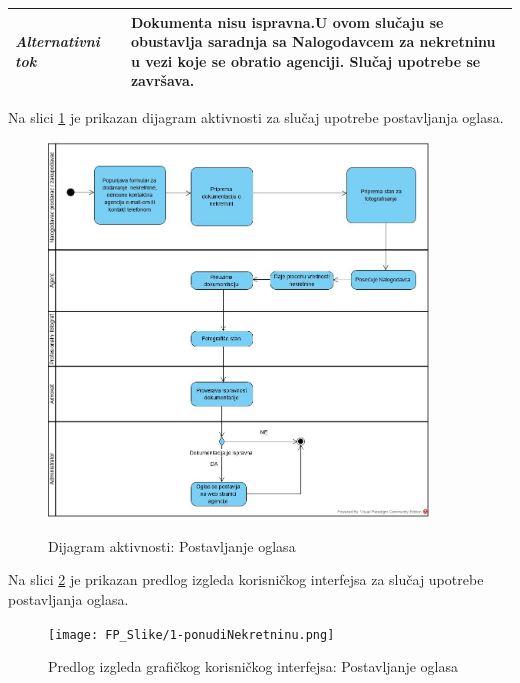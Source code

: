 \documentclass[20pt]{article}
\begin{document}
\begin{center}
\begin{longtable}{p{0.23\linewidth} p{0.77\linewidth}}
 {\it \bfseries Alternativni tok} & Dokumenta nisu ispravna.U ovom slu\v{c}aju se obustavlja saradnja sa Nalogodavcem za nekretninu u vezi koje se obratio agenciji. Slu\v{c}aj upotrebe se zavr\v{s}ava.\\
 \hline

\end{longtable}
\end{center}

\newpage
{}
\setlength{\parindent}{1cm}
\fontsize{13}{18} \selectfont 
Na slici \ref{fig:dijagramAktivnostiPostavljanjeOglasa} je prikazan dijagram aktivnosti za slu\v{c}aj upotrebe postavljanja oglasa.

\begin{figure}[h]
        \centering
        \includegraphics[width=0.9\textwidth,height=0.74\textheight]{Pictures/DijagramAktivnosti-PostavljanjeOglasa}\\
        \caption{Dijagram aktivnosti: Postavljanje oglasa}
        \label{fig:dijagramAktivnostiPostavljanjeOglasa}
    \end{figure}

\newpage
{}
\setlength{\parindent}{1cm}
\fontsize{13}{18} \selectfont 
Na slici \ref{fig:guiPostavljanjeOglasa} je prikazan predlog izgleda korisni\v ckog interfejsa za slu\v{c}aj upotrebe postavljanja oglasa.

\begin{figure}[h]
        \centering
        \texttt{[image: FP\_Slike/1-ponudiNekretninu.png]}\\
        \caption{Predlog izgleda grafi\v ckog korisni\v ckog interfejsa: Postavljanje oglasa}
        \label{fig:guiPostavljanjeOglasa}
    \end{figure}
\end{document}
